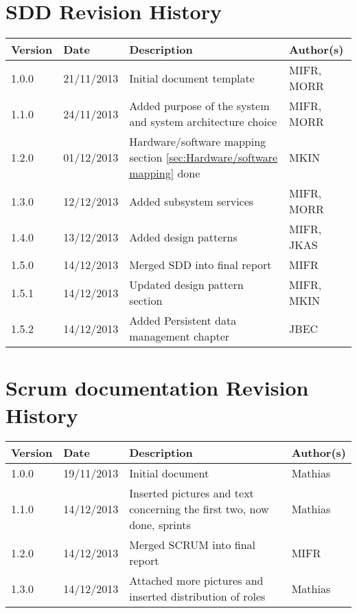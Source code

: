 \section{SDD Revision History}
\begin{center}
    \begin{tabular}{ | l | l | p{6cm} | p{4cm} |}
    \hline
    Version & Date & Description & Author(s) 
    \\ \hline
    1.0.0 & 21/11/2013 & Initial document template & MIFR, MORR
    \\ \hline
    1.1.0 & 24/11/2013 & Added purpose of the system and system architecture choice & MIFR, MORR
    \\ \hline
    1.2.0 & 01/12/2013 & Hardware/software mapping section \ref{sec:Hardware/software mapping} done & MKIN
    \\ \hline
    1.3.0 & 12/12/2013 & Added subsystem services & MIFR, MORR
    \\ \hline
    1.4.0 & 13/12/2013 & Added design patterns & MIFR, JKAS
    \\ \hline
    1.5.0 & 14/12/2013 & Merged SDD into final report & MIFR
    \\ \hline
    1.5.1 & 14/12/2013 & Updated design pattern section & MIFR, MKIN
    \\ \hline
    1.5.2 & 14/12/2013 & Added Persistent data management chapter & JBEC
    \\ \hline
    \end{tabular}
\end{center}

\section{Scrum documentation Revision History}
\begin{center}
    \begin{tabular}{ | l | l | p{6cm} | p{4cm} |}
    \hline
    Version & Date & Description & Author(s) 
    \\ \hline
    1.0.0 & 19/11/2013 & Initial document & Mathias
    \\ \hline
    1.1.0 & 14/12/2013 & Inserted pictures and text concerning the first two, now done, sprints & Mathias
    \\ \hline
    1.2.0 & 14/12/2013 & Merged SCRUM into final report & MIFR
    \\ \hline
    1.3.0 & 14/12/2013 & Attached more pictures and inserted distribution of roles & Mathias
    \\ \hline
    \end{tabular}
\end{center}